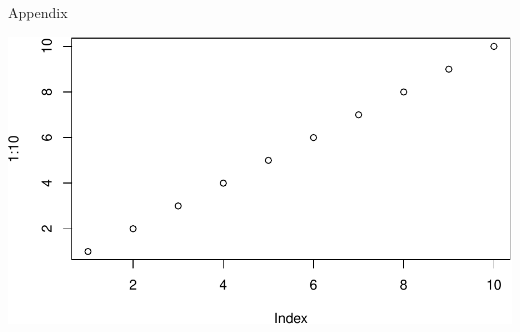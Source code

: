 \clearpage
\makeatletter
\efloat@restorefloats
\makeatother


\begin{appendix}
\section{}
Appendix

\includegraphics{IPIP_draft_files/figure-latex/unnamed-chunk-2-1.pdf}
\end{appendix}
